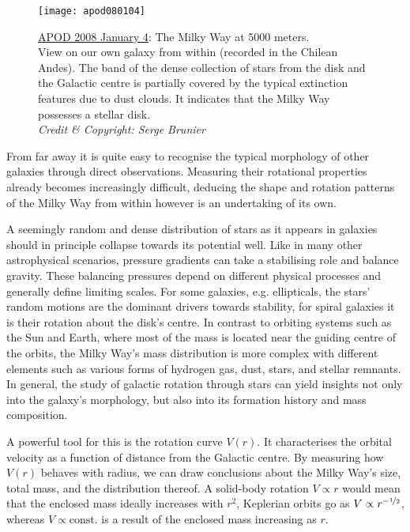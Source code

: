 \begin{figure}[h]
    \texttt{[image: apod080104]}
    \caption[The Milky Way: APOD 2008 January
    4]{\href{https://apod.nasa.gov/apod/ap080104.html}{APOD 2008 January 4}: The
    Milky Way at 5000 meters.\\
    View on our own galaxy from within (recorded in the Chilean Andes).  The
    band of the dense collection of stars from the disk and the Galactic centre
    is partially covered by the typical extinction features due to dust
    clouds.  It indicates that the Milky Way possesses a stellar disk.\\
    \textit{Credit \& Copyright: Serge Brunier}}
\end{figure}

From far away it is quite easy to recognise the typical morphology of other
galaxies through direct observations.  Measuring their rotational properties already becomes
increasingly difficult, deducing the shape and rotation patterns of the Milky
Way from within however is an undertaking of its own.

A seemingly random and dense distribution of stars as it appears in galaxies
should in principle collapse towards its potential well.  Like in many other
astrophysical scenarios, pressure gradients can take a stabilising role and
balance gravity.  These balancing pressures depend on different physical
processes and generally define limiting scales.  For some galaxies, e.g.
ellipticals, the stars' random motions are the dominant drivers towards
stability, for spiral galaxies it is their rotation about the disk's centre.  In
contrast to orbiting systems such as the Sun and Earth, where most of the mass
is located near the guiding centre of the orbits, the Milky Way's mass
distribution is more complex with different elements such as various forms of
hydrogen gas, dust, stars, and stellar remnants.  In general, the study of
galactic rotation through stars can yield insights not only into the galaxy's
morphology, but also into its formation history and mass composition.  

A powerful tool for this is the rotation curve $V(r)$.  It characterises the
orbital velocity as a function of distance from the Galactic centre. By
measuring how $V(r)$ behaves with radius, we can draw conclusions about the
Milky Way's size, total mass, and the distribution thereof.  A solid-body
rotation $V \propto r$ would mean that the enclosed mass ideally increases with
$r^{2}$, Keplerian orbits go as $V \propto r^{-\mathrm{\nicefrac{1}{2}}}$, whereas $V \propto
\text{const.}$ is a result of the enclosed mass increasing as $r$.

